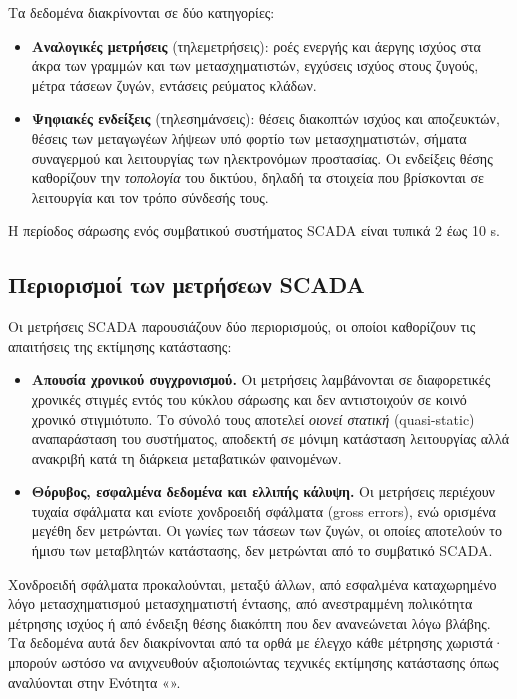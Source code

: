 Τα δεδομένα διακρίνονται σε δύο κατηγορίες:

\begin{itemize}
\item \textbf{Αναλογικές μετρήσεις} (τηλεμετρήσεις): ροές ενεργής και άεργης ισχύος στα
      άκρα των γραμμών και των μετασχηματιστών, εγχύσεις ισχύος στους ζυγούς, μέτρα τάσεων
      ζυγών, εντάσεις ρεύματος κλάδων.
\item \textbf{Ψηφιακές ενδείξεις} (τηλεσημάνσεις): θέσεις διακοπτών ισχύος και αποζευκτών,
      θέσεις των μεταγωγέων λήψεων υπό φορτίο των μετασχηματιστών, σήματα συναγερμού και
      λειτουργίας των ηλεκτρονόμων προστασίας. Οι ενδείξεις θέσης καθορίζουν την
      \emph{τοπολογία} του δικτύου, δηλαδή τα στοιχεία που βρίσκονται σε λειτουργία και τον
      τρόπο σύνδεσής τους.
\end{itemize}

Η περίοδος σάρωσης ενός συμβατικού συστήματος SCADA είναι τυπικά 2 έως 10 s.

\subsection{Περιορισμοί των μετρήσεων SCADA}

Οι μετρήσεις SCADA παρουσιάζουν δύο περιορισμούς, οι οποίοι καθορίζουν τις απαιτήσεις της
εκτίμησης κατάστασης:

\begin{itemize}
\item \textbf{Απουσία χρονικού συγχρονισμού.} Οι μετρήσεις λαμβάνονται σε διαφορετικές
      χρονικές στιγμές εντός του κύκλου σάρωσης και δεν αντιστοιχούν σε κοινό χρονικό
      στιγμιότυπο. Το σύνολό τους αποτελεί \emph{οιονεί στατική} (quasi-static)
      αναπαράσταση του συστήματος, αποδεκτή σε μόνιμη κατάσταση λειτουργίας αλλά
      ανακριβή κατά τη διάρκεια μεταβατικών φαινομένων.
\item \textbf{Θόρυβος, εσφαλμένα δεδομένα και ελλιπής κάλυψη.} Οι μετρήσεις περιέχουν
      τυχαία σφάλματα και ενίοτε χονδροειδή σφάλματα (gross errors), ενώ ορισμένα μεγέθη
      δεν μετρώνται. Οι γωνίες των τάσεων των ζυγών, οι οποίες αποτελούν το ήμισυ των
      μεταβλητών κατάστασης, δεν μετρώνται από το συμβατικό SCADA.
\end{itemize}

Χονδροειδή σφάλματα προκαλούνται, μεταξύ άλλων, από εσφαλμένα καταχωρημένο λόγο
μετασχηματισμού μετασχηματιστή έντασης, από ανεστραμμένη πολικότητα μέτρησης ισχύος ή από
ένδειξη θέσης διακόπτη που δεν ανανεώνεται λόγω βλάβης. Τα δεδομένα αυτά δεν διακρίνονται
από τα ορθά με έλεγχο κάθε μέτρησης χωριστά· μπορούν ωστόσο να ανιχνευθούν αξιοποιώντας τεχνικές εκτίμησης κατάστασης όπως αναλύονται στην Ενότητα «».
